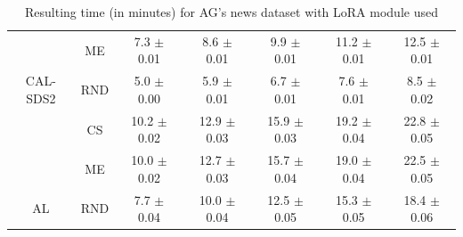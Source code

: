 \begin{table}[htbp]
\begin{tabular*}{\linewidth}{c|c|@{\extracolsep{\fill}}ccccc}
 & ME & 7.3 $\pm$ {\small 0.01} & 8.6 $\pm$ {\small 0.01} & 9.9 $\pm$ {\small 0.01} & 11.2 $\pm$ {\small 0.01} & 12.5 $\pm$ {\small 0.01}\\

\multirow{-3}{*}{\raggedright\arraybackslash CAL-SDS2} & RND & 5.0 $\pm$ {\small 0.00} & 5.9 $\pm$ {\small 0.01} & 6.7 $\pm$ {\small 0.01} & 7.6 $\pm$ {\small 0.01} & 8.5 $\pm$ {\small 0.02}\\
\midrule
 & CS & 10.2 $\pm$ {\small 0.02} & 12.9 $\pm$ {\small 0.03} & 15.9 $\pm$ {\small 0.03} & 19.2 $\pm$ {\small 0.04} & 22.8 $\pm$ {\small 0.05}\\

 & ME & 10.0 $\pm$ {\small 0.02} & 12.7 $\pm$ {\small 0.03} & 15.7 $\pm$ {\small 0.04} & 19.0 $\pm$ {\small 0.04} & 22.5 $\pm$ {\small 0.05}\\

\multirow{-3}{*}{\raggedright\arraybackslash AL} & RND & 7.7 $\pm$ {\small 0.04} & 10.0 $\pm$ {\small 0.04} & 12.5 $\pm$ {\small 0.05} & 15.3 $\pm$ {\small 0.05} & 18.4 $\pm$ {\small 0.06}\\
\bottomrule
\end{tabular*}
\caption{Resulting time (in minutes) for AG's news dataset with LoRA module used}
\label{tab:time_full_agnews_10_lora}
\end{table}

